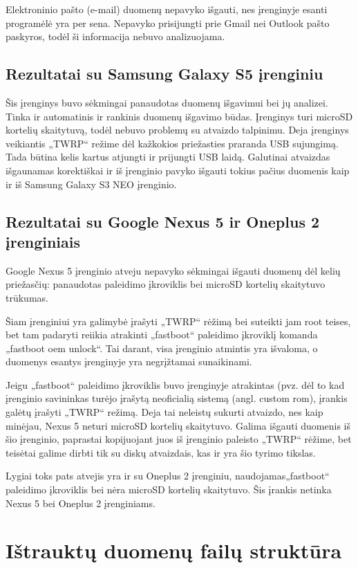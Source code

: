 \documentclass[a4paper,12pt,fleqn]{article}
\begin{document}
Elektroninio pašto  (e-mail)  duomenų nepavyko išgauti, nes įrenginyje esanti programėlė yra per sena. Nepavyko prisijungti prie Gmail nei Outlook pašto paskyros, todėl ši informacija nebuvo analizuojama. 

\subsection{Rezultatai su Samsung Galaxy S5 įrenginiu}
Šis įrenginys buvo sėkmingai panaudotas duomenų išgavimui bei jų analizei. Tinka ir automatinis ir rankinis duomenų išgavimo būdas. Įrenginys turi microSD kortelių skaitytuvą, todėl nebuvo problemų su atvaizdo talpinimu.
Deja įrenginys veikiantis „TWRP“ režime dėl kažkokios priežasties praranda USB sujungimą. Tada būtina kelis kartus atjungti ir prijungti USB laidą. Galutinai atvaizdas išgaunamas korektiškai ir iš įrenginio pavyko išgauti tokius pačius duomenis kaip ir iš Samsung Galaxy S3 NEO įrenginio.

\subsection{Rezultatai su Google Nexus 5 ir Oneplus 2 įrenginiais}
Google Nexus 5 įrenginio atveju nepavyko sėkmingai išgauti duomenų dėl kelių priežasčių: panaudotas paleidimo įkroviklis bei microSD kortelių skaitytuvo trūkumas.

Šiam įrenginiui yra galimybė įrašyti „TWRP“ rėžimą bei suteikti jam root teises, bet tam padaryti reiikia atrakinti „fastboot“ paleidimo įkroviklį komanda „fastboot oem unlock“. Tai darant, visa įrenginio atmintis yra išvaloma, o duomenys esantys įrenginyje yra negrįžtamai sunaikinami. 

Jeigu „fastboot“ paleidimo įkroviklis buvo įrenginyje atrakintas (pvz. dėl to kad įrenginio savininkas turėjo įrašytą neoficialią sistemą (angl. custom rom), įrankis galėtų įrašyti „TWRP“ režimą. Deja tai neleistų sukurti atvaizdo, nes kaip minėjau, Nexus 5 neturi microSD kortelių skaitytuvo. Galima išgauti duomenis iš šio įrenginio, paprastai kopijuojant juos iš įrenginio paleisto „TWRP“ rėžime, bet teisėtai galime dirbti tik su diskų atvaizdais, kas ir yra šio tyrimo tikslas. 

Lygiai toks pats atvejis yra ir su Oneplus 2 įrenginiu, naudojamas„fastboot“ paleidimo įkroviklis bei nėra microSD kortelių skaitytuvo. Šis įrankis netinka Nexus 5 bei Oneplus 2 įrenginiams.

\section{Ištrauktų duomenų failų struktūra}
\end{document}
